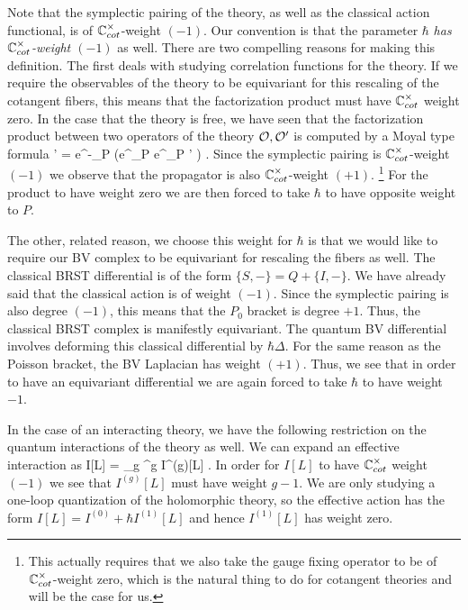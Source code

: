 Note that the symplectic pairing of the theory, as well as the classical action functional, is of $\mathbb C^{\times}_{cot}$-weight $(-1)$.
Our convention is that the parameter $\hbar$ {\em has $\mathbb C^\times_{cot}$-weight $(-1)$} as well. 
There are two compelling reasons for making this definition. 
The first deals with studying correlation functions for the theory. 
If we require the observables of the theory to be equivariant for this rescaling of the cotangent fibers, this means that the factorization product must have $\mathbb C^\times_{cot}$ weight zero.
In the case that the theory is free, we have seen that the factorization product between two operators of the theory $\mathcal O, \mathcal O'$ is computed by a Moyal type formula
\be\label{moyal}
\cO \star \cO' = e^{-\hbar \partial_P} \left(e^{\hbar \partial_P} \cO \cdot e^{\hbar \partial_P} \cO' \right) .
\ee
Since the symplectic pairing is $\mathbb C^\times_{cot}$-weight $(-1)$ we observe that the propagator is also $\mathbb C^\times_{cot}$-weight $(+1)$.
\footnote{This actually requires that we also take the gauge fixing operator to be of $\mathbb C^\times_{cot}$-weight zero, which is the natural thing to do for cotangent theories and will be the case for us.}
For the product to have weight zero we are then forced to take $\hbar$ to have opposite weight to $P$.

The other, related reason, we choose this weight for $\hbar$ is that we would like to require our BV complex to be equivariant for rescaling the fibers as well. 
The classical BRST differential is of the form $\{S,-\} = Q + \{I,-\}$.
We have already said that the classical action is of weight $(-1)$.
Since the symplectic pairing is also degree $(-1)$, this means that the $P_0$ bracket is degree $+1$. 
Thus, the classical BRST complex is manifestly equivariant.
The quantum BV differential involves deforming this classical differential by $\hbar \Delta$. 
For the same reason as the Poisson bracket, the BV Laplacian has weight $(+1)$. 
Thus, we see that in order to have an equivariant differential we are again forced to take $\hbar$ to have weight $-1$. 

In the case of an interacting theory, we have the following restriction on the quantum interactions of the theory as well. 
We can expand an effective interaction as
\ben
I[L] = \sum_{g } \hbar^g I^{(g)}[L] .
\een
In order for $I[L]$ to have $\mathbb C^\times_{cot}$ weight $(-1)$ we see that $I^{(g)}[L]$ must have weight $g-1$. 
We are only studying a one-loop quantization of the holomorphic theory, so the effective action has the form $I[L] = I^{(0)} + \hbar I^{(1)}[L]$ and hence $I^{(1)}[L]$ has weight zero. 

